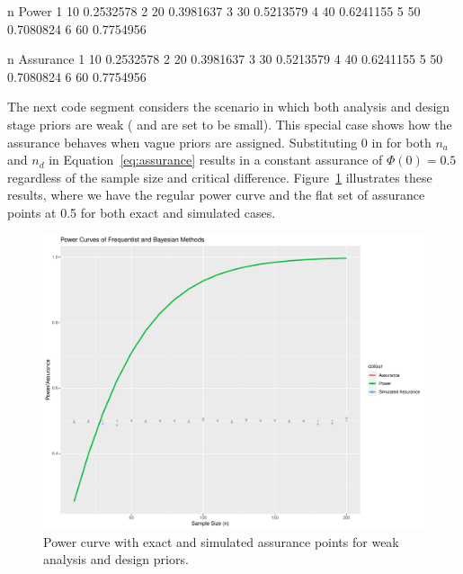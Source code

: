 \begin{Schunk}
\begin{Sout}
     n     Power
1   10 0.2532578
2   20 0.3981637
3   30 0.5213579
4   40 0.6241155
5   50 0.7080824
6   60 0.7754956

     n Assurance
1   10 0.2532578
2   20 0.3981637
3   30 0.5213579
4   40 0.6241155
5   50 0.7080824
6   60 0.7754956
\end{Sout}
\end{Schunk}


The next code segment considers the scenario in which both analysis
and design stage priors are weak ( 
and  are set to be small). This special case
shows how the assurance behaves when vague
priors are assigned. 
Substituting 0 in for both $n_a$ and $n_d$ in
Equation~\eqref{eq:assurance} results in a constant
assurance of $\Phi(0) = 0.5$ regardless of the sample size
and critical difference.  Figure~\ref{fig:pwr_curve_ex2} illustrates
these results, where we have the regular power curve and
the flat set of assurance points at 0.5 for both exact and simulated
cases. 

\begin{figure}[t!]
\centering
\includegraphics[width = 8 cm]{pwr_curve_ex2.pdf}
\caption{\label{fig:pwr_curve_ex2} Power curve with exact and simulated
assurance points for weak analysis and design priors.}
\end{figure}

